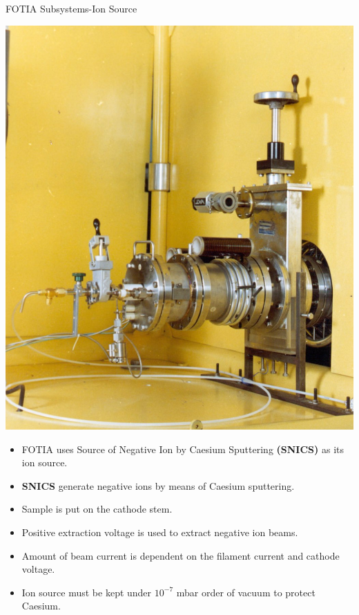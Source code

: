 \documentclass[11pt]{beamer}
\begin{document}
\begin{frame}{FOTIA Subsystems-Ion Source}

   \begin{center}
    \includegraphics[scale=0.1]{SNICS.jpg}
   \end{center}
  
   
  \begin{itemize}
   
    \item FOTIA uses Source of Negative Ion by Caesium Sputtering \textbf{(SNICS)} as its ion source.
    \item \textbf{SNICS} generate negative ions by means of Caesium sputtering.
    \item Sample is put on the cathode stem.
    \item Positive extraction voltage is used to extract negative ion beams.
    \item Amount of beam current is dependent on the filament current and cathode voltage.
    \item Ion source must be kept under $10^{-7}$ mbar order of vacuum to protect Caesium.
   
   \end{itemize}

\end{frame}
\end{document}
